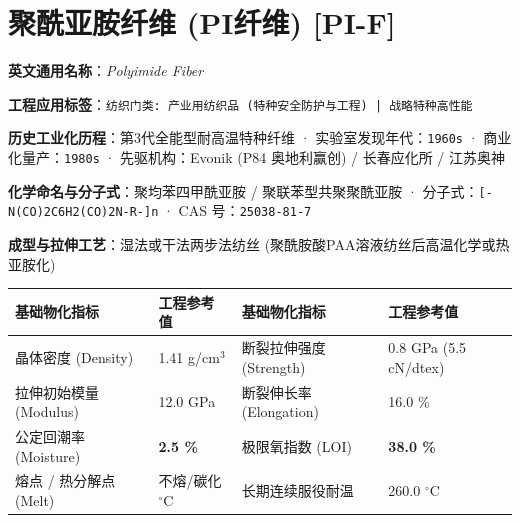 \documentclass[11pt,openright,twoside,UTF8]{ctexbook}
\begin{document}
\section{聚酰亚胺纤维 (PI纤维) [PI-F]}
\label{sec:pi-f}

\noindent\textbf{英文通用名称}：\textit{Polyimide Fiber}\par
\noindent\textbf{工程应用标签}：\texttt{纺织门类: 产业用纺织品 (特种安全防护与工程) | 战略特种高性能}\par
\noindent\textbf{历史工业化历程}：第3代全能型耐高温特种纤维 · 实验室发现年代：\texttt{1960s} · 商业化量产：\texttt{1980s} · 先驱机构：Evonik (P84 奥地利赢创) / 长春应化所 / 江苏奥神\par
\noindent\textbf{化学命名与分子式}：聚均苯四甲酰亚胺 / 聚联苯型共聚聚酰亚胺 · 分子式：\texttt{[-N(CO)2C6H2(CO)2N-R-]n} · CAS 号：\texttt{25038-81-7}\par
\noindent\textbf{成型与拉伸工艺}：湿法或干法两步法纺丝 (聚酰胺酸PAA溶液纺丝后高温化学或热亚胺化)\par

\vspace{0.15cm}
\begin{center}
\small
\begin{tabularx}{\textwidth}{p{3.8cm}Xp{3.8cm}X}
\toprule
\textbf{基础物化指标} & \textbf{工程参考值} & \textbf{基础物化指标} & \textbf{工程参考值} \\
\midrule
晶体密度 (Density) & 1.41 g/cm$^3$ & 断裂拉伸强度 (Strength) & 0.8 GPa (5.5 cN/dtex) \\
拉伸初始模量 (Modulus) & 12.0 GPa & 断裂伸长率 (Elongation) & 16.0 \% \\
公定回潮率 (Moisture) & \textbf{2.5 \%} & 极限氧指数 (LOI) & \textbf{38.0 \%} \\
熔点 / 热分解点 (Melt) & 不熔/碳化 $^\circ\mathrm{C}$ & 长期连续服役耐温 & 260.0 $^\circ\mathrm{C}$ \\
\bottomrule
\end{tabularx}
\end{center}
\vspace{0.15cm}
\end{document}
